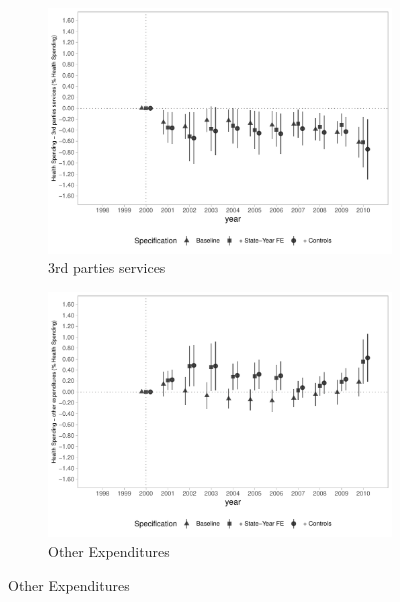 \begin{figure}[h]
\begin{center}
\begin{subfigure}{0.48\textwidth}
    \end{subfigure}
    \begin{subfigure}{0.48\textwidth}
        \centering
        \caption{\scriptsize 3rd parties services}\label{fig:siops4_c}
        \includegraphics[width=\textwidth]{plots/spending/siops_despservicoster_share_dist_ec29_baseline_dist_ec29_baseline_full.pdf}
    \end{subfigure}
    \begin{subfigure}{0.48\textwidth}
        \centering
        \caption{\scriptsize Other Expenditures}\label{fig:siops4_d}
        \includegraphics[width=\textwidth]{plots/spending/siops_despoutros_share_dist_ec29_baseline_dist_ec29_baseline_full.pdf}
    \end{subfigure}
    
    \end{center}
    
\end{figure}

